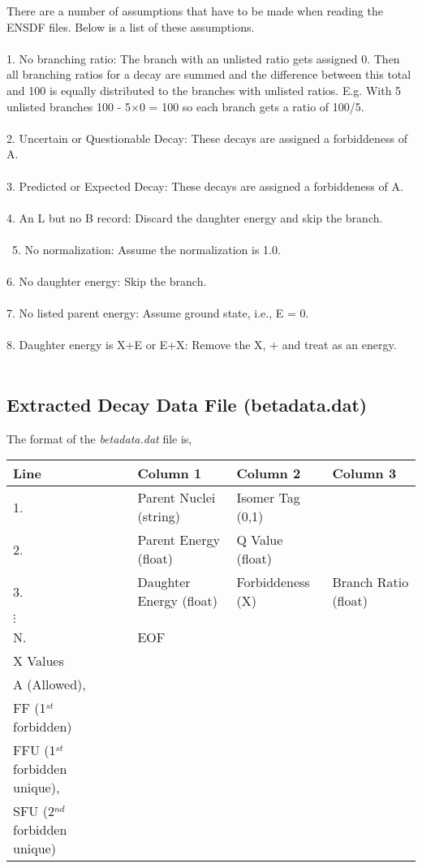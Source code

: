 \documentclass{report}
\begin{document}
There are a number of assumptions that have to be made when reading the ENSDF files. Below is a list of
these assumptions. \\ \\
1. No branching ratio: The branch with an unlisted ratio gets assigned 0. Then all branching ratios for a 
decay are summed and the difference between this total and 100 is equally distributed to the branches with unlisted ratios. 
E.g. With 5 unlisted branches 100 - 5$\times$0 = 100 so each branch gets a ratio of 100/5. \\ \\
2. Uncertain or Questionable Decay: These decays are assigned a forbiddeness of A. \\ \\
3. Predicted or Expected Decay: These decays are assigned a forbiddeness of A. \\ \\
4. An L but no B record: Discard the daughter energy and skip the branch.\\ \\\
5. No normalization: Assume the normalization is 1.0. \\ \\
6. No daughter energy: Skip the branch. \\ \\
7. No listed parent energy: Assume ground state, i.e., E = 0. \\ \\
8. Daughter energy is X+E or E+X: Remove the X, + and treat as an energy. \\ \\

\subsection{Extracted Decay Data File (betadata.dat)}

The format of the \textit{betadata.dat} file is,

\begin{table}[H]
\centering
\renewcommand{\arraystretch}{1.75}
  \begin{tabular}{lllll}
    \toprule 
     Line & & Column 1 & Column 2  & Column 3  \\
       \midrule
  	1. & &Parent Nuclei (string) &  Isomer Tag (0,1)&  \\  	
	2. & &Parent Energy (float)&   Q Value (float)  &\\  
	3. & &Daughter Energy (float)& Forbiddeness (X)&  Branch Ratio (float)  \\  	
	$\vdots$ & &  &  &     \\  
	N. & & EOF &  &     \\  			
	\midrule
	X Values  &&&&\\
	\midrule
         A (Allowed), &&&&\\
	FF (1$^{st}$ forbidden) &&&&\\
	FFU (1$^{st}$ forbidden unique), &&&&\\
	SFU (2$^{nd}$ forbidden unique)&&&&\\
    	   \bottomrule
  \end{tabular}
\end{table}
\end{document}
